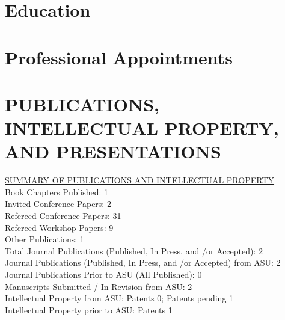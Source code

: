 \documentclass[11pt,letterpaper,sans]{moderncv}
\begin{document}
\makecvtitle

\section{Education}

\section{Professional Appointments}




\section{PUBLICATIONS, INTELLECTUAL PROPERTY, AND PRESENTATIONS}

\begin{framed}
\underline{SUMMARY OF PUBLICATIONS AND INTELLECTUAL PROPERTY} \\
Book Chapters Published: 1 \\
Invited Conference Papers: 2 \\
Refereed Conference Papers: 31 \\
Refereed Workshop Papers: 9 \\
Other Publications: 1 \\
Total Journal Publications (Published, In Press, and /or Accepted): 2 \\
Journal Publications (Published, In Press, and /or Accepted) from ASU: 2 \\
Journal Publications Prior to ASU (All Published): 0 \\
Manuscripts Submitted / In Revision from ASU: 2 \\
Intellectual Property from ASU:  Patents 0; Patents pending 1 \\
Intellectual Property prior to ASU:  Patents 1 \\
\end{framed}
\end{document}
